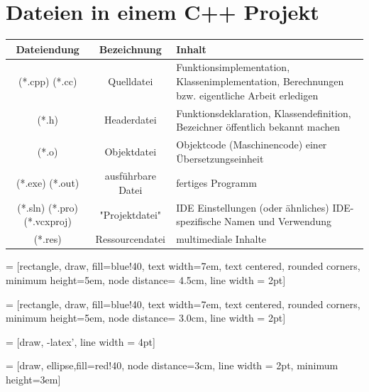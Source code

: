 \documentclass[a4paper]{report}
\begin{document}
\section{Dateien in einem C++ Projekt}
\begin{center}
\begin{tabular}{|c|c|p{9cm}|}
	\hline
	Dateiendung & Bezeichnung & Inhalt \\
	\hline
	(*.cpp) (*.cc) & Quelldatei & Funktionsimplementation, Klassenimplementation, \newline Berechnungen bzw. eigentliche Arbeit erledigen \\ \hline
	(*.h) & Headerdatei & Funktionsdeklaration, Klassendefinition, \newline Bezeichner öffentlich bekannt machen \\
	\hline
	(*.o) & Objektdatei & Objektcode (Maschinencode) einer Übersetzungseinheit\\
	\hline
	(*.exe) (*.out) & ausführbare Datei & fertiges Programm \\
	\hline \hline
	(*.sln) (*.pro) (*.vcxproj) & "Projektdatei" & IDE Einstellungen (oder ähnliches) \newline IDE-spezifische Namen und Verwendung\\
	\hline \hline
	(*.res) & Ressourcendatei & multimediale Inhalte\\
	\hline
\end{tabular}

\vspace{4ex}

 = [rectangle, draw, fill=blue!40, 
text width=7em, text centered, rounded corners, minimum height=5em, node distance= 4.5cm, line width = 2pt]


 = [rectangle, draw, fill=blue!40, 
text width=7em, text centered, rounded corners, minimum height=5em, node distance= 3.0cm, line width = 2pt]


 = [draw, -latex', line width = 4pt]


 = [draw, ellipse,fill=red!40, node distance=3cm, line width = 2pt,
minimum height=3em]

{\large

}
\end{center}
\end{document}
